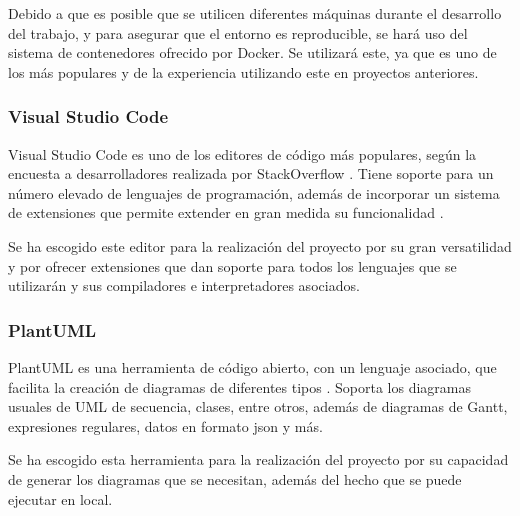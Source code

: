 Debido a que es posible que se utilicen diferentes máquinas durante el desarrollo del trabajo, y para asegurar que el entorno es reproducible, se hará uso del sistema de contenedores ofrecido por Docker. Se utilizará este, ya que es uno de los más populares y de la experiencia utilizando este en proyectos anteriores.

\subsubsection{Visual Studio Code}

Visual Studio Code es uno de los editores de código más populares, según la encuesta a desarrolladores realizada por StackOverflow \cite{2023devsurvey}. Tiene soporte para un número elevado de lenguajes de programación, además de incorporar un sistema de extensiones que permite extender en gran medida su funcionalidad \cite{vscodeweb}.

Se ha escogido este editor para la realización del proyecto por su gran versatilidad y por ofrecer extensiones que dan soporte para todos los lenguajes que se utilizarán y sus compiladores e interpretadores asociados.

\color{blue}  %
\subsubsection{PlantUML}

PlantUML es una herramienta de código abierto, con un lenguaje asociado, que facilita la creación de diagramas de diferentes tipos \cite{plantumlweb}. Soporta los diagramas usuales de UML de secuencia, clases, entre otros, además de diagramas de Gantt, expresiones regulares, datos en formato \acrshort{json} y más.

Se ha escogido esta herramienta para la realización del proyecto por su capacidad de generar los diagramas que se necesitan, además del hecho que se puede ejecutar en local.
\color{black}  %
